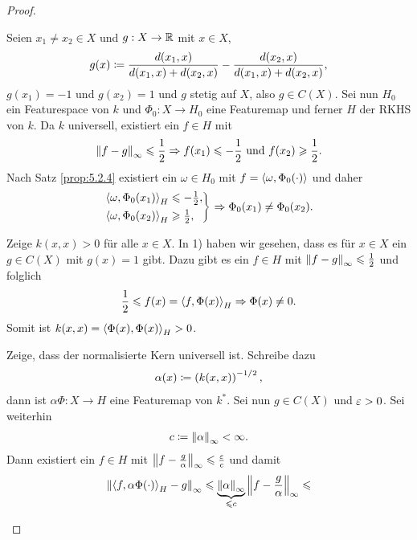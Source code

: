 \begin{proof}
\begin{proofenum}
\item Seien $x_1\neq x_2\in X$ und $g: X\to \mathbb{R}$ mit $x\in X$,
\begin{align*}
g(x) \coloneq \frac{d(x_1,x)}{d(x_1,x)+d(x_2,x)} - \frac{d(x_2,x)}{d(x_1,x)+d(x_2,x)},
\end{align*}
$g(x_1)=-1$ und $g(x_2)=1$ und $g$ stetig auf $X$, also $g\in C(X)$. Sei nun
$H_0$ ein Featurespace von $k$ und $\Phi_0 : X\to H_0$ eine Featuremap und
ferner $H$ der RKHS von $k$. Da $k$ universell, existiert ein $f\in H$ mit
\begin{align*}
\left\|f-g\right\|_\infty \leqslant \frac{1}{2} \Rightarrow f(x_1) \leqslant -\frac{1}{2}\text{ und
} f(x_2)\geqslant \frac{1}{2}.
\end{align*}
Nach Satz \ref{prop:5.2.4} existiert ein $\omega\in H_0$ mit
$f=\left\langle\omega,\Phi_0(\cdot)\right\rangle$ und daher
\begin{align*}
\begin{rcases}
\left\langle\omega,\Phi_0(x_1)\right\rangle_H \leqslant -\frac{1}{2},\\
\left\langle\omega,\Phi_0(x_2)\right\rangle_H \geqslant \frac{1}{2},
\end{rcases}
\Rightarrow
\Phi_0(x_1)\neq \Phi_0(x_2).
\end{align*}
\item Zeige $k(x,x)>0$ für alle $x\in X$. In 1) haben wir gesehen, dass es für
$x\in X$ ein $g\in C(X)$ mit $g(x)=1$ gibt. Dazu gibt es ein $f\in H$ mit
$\left\|f-g\right\|_\infty \leqslant \frac{1}{2}$ und folglich
\begin{align*}
\frac{1}{2} \leqslant f(x) = \left\langle f,\Phi(x)\right\rangle_H \Rightarrow \Phi(x)\neq 0.
\end{align*}
Somit ist $k(x,x) = \left\langle\Phi(x),\Phi(x)\right\rangle_H > 0$.
\item Zeige, dass der normalisierte Kern universell ist. Schreibe dazu
\begin{align*}
\alpha(x) \coloneq \left(k(x,x) \right)^{-1/2},
\end{align*}
dann ist $\alpha\Phi : X\to H$ eine Featuremap von $k^*$. Sei nun $g\in C(X)$
und $\varepsilon > 0$. Sei weiterhin
\begin{align*}
c \coloneq \left\|\alpha\right\|_\infty < \infty.
\end{align*}
Dann existiert ein $f\in H$ mit $\left\|f-\frac{g}{\alpha}\right\|_\infty \leqslant
\frac{\varepsilon}{c}$ und damit
\begin{align*}
\norm{\lin{f,\alpha \Phi(\cdot)}_H-g}_\infty \le
\underbrace{\norm{\alpha}_\infty}_{\le c} \norm{f-\frac{g}{\alpha}}_\infty \le

\end{align*}
\end{proofenum}
\end{proof}
